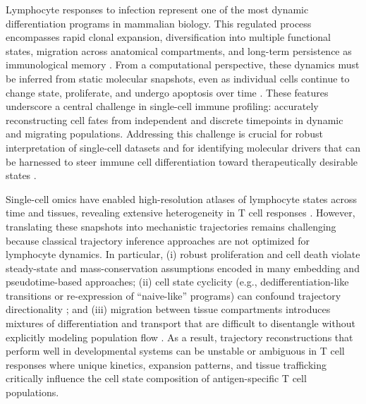 Lymphocyte responses to infection represent one of the most dynamic differentiation programs in mammalian biology. This regulated process encompasses rapid clonal expansion, diversification into multiple functional states, migration across anatomical compartments, and long-term persistence as immunological memory \citep{changMolecularRegulationEffector2014, kohCD8TcellSubsets2023, adamsClonalExpansionInnate2020, masopustIntegrationCellMigration2013}. From a computational perspective, these dynamics must be inferred from static molecular snapshots, even as individual cells continue to change state, proliferate, and undergo apoptosis over time \citep{lavenantMathematicalTheoryTrajectory2021, huangVivoCRISPRScreening2021, yoonCellCycleTime2010}. These features underscore a central challenge in single-cell immune profiling: accurately reconstructing cell fates from independent and discrete timepoints in dynamic and migrating populations. Addressing this challenge is crucial for robust interpretation of single-cell datasets and for identifying molecular drivers that can be harnessed to steer immune cell differentiation toward therapeutically desirable states \citep{heSquidiffPredictingCellular2026, parkBayesianFrameworkInferring2024, baileyConstructingCureEngineering2025}.

Single-cell omics have enabled high-resolution atlases of lymphocyte states across time and tissues, revealing extensive heterogeneity in T cell responses \citep{greenEnhancerdrivenGeneRegulatory2025, milnerHeterogenousPopulationsTissueResident2020, kurdEarlyPrecursorsMolecular2020, chungMultiOmicsAtlasAssistedDiscovery2024, chuPancancerCellAtlas2023, buquicchioDistinctEpigenomicLandscapes2024}. However, translating these snapshots into mechanistic trajectories remains challenging because classical trajectory inference approaches \citep{streetSlingshotCellLineage2018, haghverdiDiffusionPseudotimeRobustly2016, bergenGeneralizingRNAVelocity2020} are not optimized for lymphocyte dynamics. In particular, (i) robust proliferation and cell death violate steady-state and mass-conservation assumptions encoded in many embedding and pseudotime-based approaches; (ii) cell state cyclicity (e.g., dedifferentiation-like transitions or re-expression of ``naive-like'' programs) can confound trajectory directionality \citep{hudsonTechnologyMeetsTILs2022, youngbloodEffectorCD8Cells2017, herndler-brandstetterKLRG1EffectorCD82018}; and (iii) migration between tissue compartments introduces mixtures of differentiation and transport that are difficult to disentangle without explicitly modeling population flow \citep{masopustDynamicCellMigration2010}. As a result, trajectory reconstructions that perform well in developmental systems can be unstable or ambiguous in T cell responses where unique kinetics, expansion patterns, and tissue trafficking critically influence the cell state composition of antigen-specific T cell populations.

